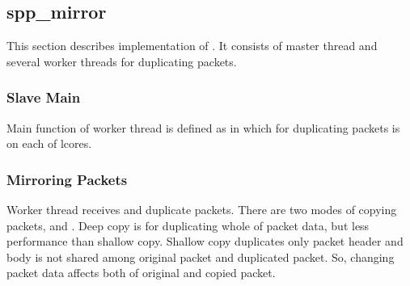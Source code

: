 \documentclass[a4paper,11pt,openany,oneside,english]{sphinxmanual}
\begin{document}
\subsection{spp\_mirror}
\label{\detokenize{design/impl/spp_mirror:spp-mirror}}\label{\detokenize{design/impl/spp_mirror:spp-vf-explain-spp-mirror}}\label{\detokenize{design/impl/spp_mirror::doc}}
This section describes implementation of .
It consists of master thread and several worker threads for duplicating
packets.


\subsubsection{Slave Main}
\label{\detokenize{design/impl/spp_mirror:slave-main}}
Main function of worker thread is defined as  in which
for duplicating packets is  on each of lcores.

\begin{sphinxVerbatim}[commandchars=\\\{\},formatcom=\footnotesize]
        

      \PYG{p}{[}\PYG{p}{]}
       
\end{sphinxVerbatim}


\subsubsection{Mirroring Packets}
\label{\detokenize{design/impl/spp_mirror:mirroring-packets}}
Worker thread receives and duplicate packets. There are two modes of copying
packets,  and .
Deep copy is for duplicating whole of packet data, but less performance than
shallow copy. Shallow copy duplicates only packet header and body is not shared
among original packet and duplicated packet. So, changing packet data affects
both of original and copied packet.
\end{document}
